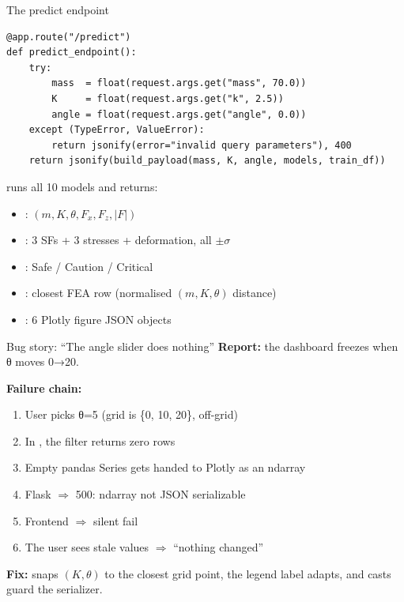 \begin{frame}[fragile]{The predict endpoint}
\begin{lstlisting}
@app.route("/predict")
def predict_endpoint():
    try:
        mass  = float(request.args.get("mass", 70.0))
        K     = float(request.args.get("k", 2.5))
        angle = float(request.args.get("angle", 0.0))
    except (TypeError, ValueError):
        return jsonify(error="invalid query parameters"), 400
    return jsonify(build_payload(mass, K, angle, models, train_df))
\end{lstlisting}

  \vspace{0.3cm}
   runs all 10 models and returns:
  \begin{itemize}\small
    \item {}: \((m, K, \theta, F_x, F_z, |F|)\)
    \item {}: 3 SFs + 3 stresses + deformation, all \(\pm\sigma\)
    \item {}: Safe / Caution / Critical
    \item {}: closest FEA row (normalised \((m, K, \theta)\) distance)
    \item {}: 6 Plotly figure JSON objects
  \end{itemize}
\end{frame}

\begin{frame}{Bug story: ``The angle slider does nothing''}
  \textbf{Report:} the dashboard \alert{freezes} when θ moves 0→20.

  \vspace{0.4cm}
  \textbf{Failure chain:}
  \begin{enumerate}\small
    \item User picks θ=5 (grid is \{0, 10, 20\}, off-grid)
    \item In , the filter
           returns \alert{zero rows}
    \item Empty pandas Series gets handed to Plotly as an ndarray
    \item Flask  \(\Rightarrow\) \alert{500: ndarray not JSON serializable}
    \item Frontend  \(\Rightarrow\) \alert{silent fail}
    \item The user sees stale values \(\Rightarrow\) ``nothing changed''
  \end{enumerate}

  \vspace{0.3cm}
  \textbf{Fix:}  snaps \((K, \theta)\) to the
  closest grid point, the legend label adapts, and  casts
  guard the serializer.
\end{frame}

